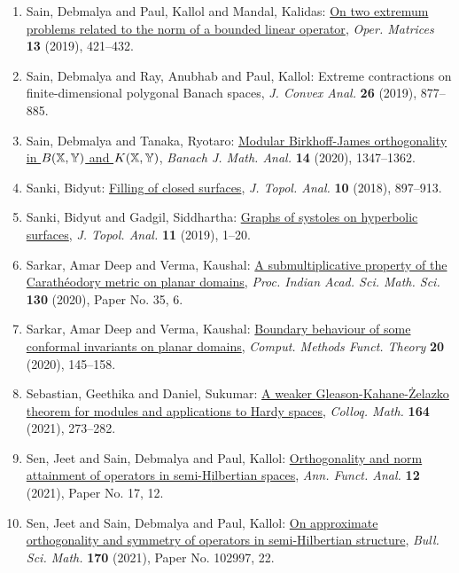 \begin{enumerate}
{bounded linear operators}, \emph{Linear Multilinear Algebra} {\bf 68} (2020), 2484--2494.
\item Sain, Debmalya and Paul, Kallol and Mandal, Kalidas: \href{https://doi.org/10.7153/oam-2019-13-31}{On two extremum problems related to the norm of a bounded
linear operator}, \emph{Oper. Matrices} {\bf 13} (2019), 421--432.
\item Sain, Debmalya and Ray, Anubhab and Paul, Kallol: Extreme contractions on finite-dimensional polygonal {B}anach
spaces, \emph{J. Convex Anal.} {\bf 26} (2019), 877--885.
\item Sain, Debmalya and Tanaka, Ryotaro: \href{https://doi.org/10.1007/s43037-020-00064-z}{Modular {B}irkhoff-{J}ames orthogonality in {$B(\Bbb{X,Y})$}
and {$K(\Bbb{X,Y})$}}, \emph{Banach J. Math. Anal.} {\bf 14} (2020), 1347--1362.
\item Sanki, Bidyut: \href{https://doi.org/10.1142/S1793525318500309}{Filling of closed surfaces}, \emph{J. Topol. Anal.} {\bf 10} (2018), 897--913.
\item Sanki, Bidyut and Gadgil, Siddhartha: \href{https://doi.org/10.1142/S1793525319500018}{Graphs of systoles on hyperbolic surfaces}, \emph{J. Topol. Anal.} {\bf 11} (2019), 1--20.
\item Sarkar, Amar Deep and Verma, Kaushal: \href{https://doi.org/10.1007/s12044-020-00565-9}{A submultiplicative property of the {C}arath\'{e}odory metric on
planar domains}, \emph{Proc. Indian Acad. Sci. Math. Sci.} {\bf 130} (2020), Paper No. 35, 6.
\item Sarkar, Amar Deep and Verma, Kaushal: \href{https://doi.org/10.1007/s40315-020-00303-2}{Boundary behaviour of some conformal invariants on planar
domains}, \emph{Comput. Methods Funct. Theory} {\bf 20} (2020), 145--158.
\item Sebastian, Geethika and Daniel, Sukumar: \href{https://doi.org/10.4064/cm8015-9-2019}{A weaker {G}leason-{K}ahane-\.{Z}elazko theorem for modules and
applications to {H}ardy spaces}, \emph{Colloq. Math.} {\bf 164} (2021), 273--282.
\item Sen, Jeet and Sain, Debmalya and Paul, Kallol: \href{https://doi.org/10.1007/s43034-020-00104-7}{Orthogonality and norm attainment of operators in
semi-{H}ilbertian spaces}, \emph{Ann. Funct. Anal.} {\bf 12} (2021), Paper No. 17, 12.
\item Sen, Jeet and Sain, Debmalya and Paul, Kallol: \href{https://doi.org/10.1016/j.bulsci.2021.102997}{On approximate orthogonality and symmetry of operators in
semi-{H}ilbertian structure}, \emph{Bull. Sci. Math.} {\bf 170} (2021), Paper No. 102997, 22.

\end{enumerate}
